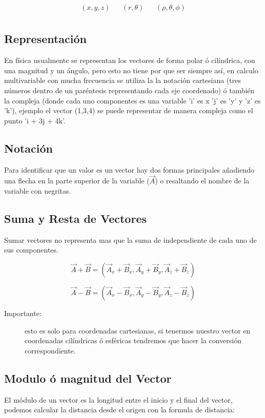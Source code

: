 \documentclass{article}
\begin{document}
\[\begin{aligned}
  (x,y,z) && (r,\theta) && (\rho, \theta, \phi) \\
\end{aligned}\] 

\subsection{Representación}
\label{sec:orgdebbae1}
En física usualmente se representan los vectores de forma polar ó cilíndrica, con una magnitud y un ángulo, pero esto no tiene por que ser siempre así, en calculo multivariable con mucha frecuencia se utiliza la la notación cartesiana (tres números dentro de un paréntesis representando cada eje coordenado) ó también la compleja (donde cada uno componentes es una variable 'i' es x 'j' es 'y' y 'z' es 'k'), ejemplo el vector (1,3,4) se puede representar de manera compleja como el punto 'i + 3j + 4k'. 

\subsection{Notación}
\label{sec:org6d84653}
Para identificar que un valor es un vector hay dos formas principales añadiendo una flecha en la parte superior de la variable (\(\vec{A}\)) o resaltando el nombre de la variable con negritas. 

\subsection{Suma y Resta de Vectores}
\label{sec:orgf7e4a31}
Sumar vectores no representa mas que la suma de independiente de cada uno de sus componentes.

\[
\vec{A} + \vec{B} = (\vec{A}_x + \vec{B}_x,\vec{A}_y + \vec{B}_y,\vec{A}_z + \vec{B}_z)
\]

\[
\vec{A} - \vec{B} = (\vec{A}_x - \vec{B}_x,\vec{A}_y - \vec{B}_y,\vec{A}_z - \vec{B}_z)
\]

\begin{description}
\item[{Importante:}] esto es solo para coordenadas cartesianas, si tenermos nuestro vector en coordenadas cilíndricas ó esféricas tendremos que hacer la conversión correspondiente.
\end{description}

\subsection{Modulo ó magnitud del Vector}
\label{sec:org5a4e872}
El módulo de un vector es la longitud entre el inicio y el final del vector, podemos calcular la distancia desde el origen con la formula de distancia:
\end{document}
